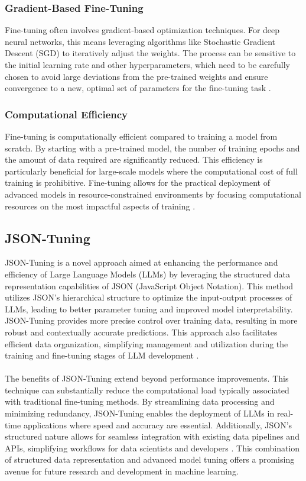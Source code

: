 \subsubsection*{Gradient-Based Fine-Tuning}
Fine-tuning often involves gradient-based optimization techniques. For deep neural networks, this means leveraging algorithms like Stochastic Gradient Descent (SGD) to iteratively adjust the weights. The process can be sensitive to the initial learning rate and other hyperparameters, which need to be carefully chosen to avoid large deviations from the pre-trained weights and ensure convergence to a new, optimal set of parameters for the fine-tuning task \cite{Vrbancic2020Transfer}.

\subsubsection*{Computational Efficiency}
Fine-tuning is computationally efficient compared to training a model from scratch. By starting with a pre-trained model, the number of training epochs and the amount of data required are significantly reduced. This efficiency is particularly beneficial for large-scale models where the computational cost of full training is prohibitive. Fine-tuning allows for the practical deployment of advanced models in resource-constrained environments by focusing computational resources on the most impactful aspects of training \cite{Xiao2023Offsite-Tuning:}.

\subsection*{JSON-Tuning} 
JSON-Tuning is a novel approach aimed at enhancing the performance and efficiency of Large Language Models (LLMs) by leveraging the structured data representation capabilities of JSON (JavaScript Object Notation). This method utilizes JSON's hierarchical structure to optimize the input-output processes of LLMs, leading to better parameter tuning and improved model interpretability. JSON-Tuning provides more precise control over training data, resulting in more robust and contextually accurate predictions. This approach also facilitates efficient data organization, simplifying management and utilization during the training and fine-tuning stages of LLM development \cite{zheng2024llamafactory}.
\\\\
The benefits of JSON-Tuning extend beyond performance improvements. This technique can substantially reduce the computational load typically associated with traditional fine-tuning methods. By streamlining data processing and minimizing redundancy, JSON-Tuning enables the deployment of LLMs in real-time applications where speed and accuracy are essential. Additionally, JSON's structured nature allows for seamless integration with existing data pipelines and APIs, simplifying workflows for data scientists and developers \cite{zhu2024lift}. This combination of structured data representation and advanced model tuning offers a promising avenue for future research and development in machine learning.

